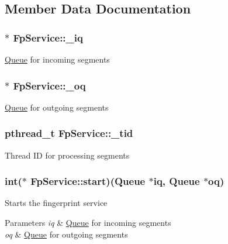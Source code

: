 \subsection{\-Member \-Data \-Documentation}
\hypertarget{structFpService_a0da51b062ecfa7d09074af07f6258581}{
\subsubsection[{\-\_\-iq}]{$\ast$ {\bf \-Fp\-Service\-::\-\_\-iq}}}\label{structFpService_a0da51b062ecfa7d09074af07f6258581}
\hyperlink{structQueue}{\-Queue} for incoming segments \hypertarget{structFpService_a78ba06235033bd5d83a7f425ef49fc49}{
\subsubsection[{\-\_\-oq}]{$\ast$ {\bf \-Fp\-Service\-::\-\_\-oq}}}\label{structFpService_a78ba06235033bd5d83a7f425ef49fc49}
\hyperlink{structQueue}{\-Queue} for outgoing segments \hypertarget{structFpService_a94191c2fd018c83395922a6a6d490f5d}{
\subsubsection[{\-\_\-tid}]{\setlength{\rightskip}{0pt plus 5cm}pthread\-\_\-t {\bf \-Fp\-Service\-::\-\_\-tid}}}\label{structFpService_a94191c2fd018c83395922a6a6d490f5d}
\-Thread \-I\-D for processing segments \hypertarget{structFpService_a8dc45a1cac37860a976a44674e4ddc70}{
\subsubsection[{start}]{\setlength{\rightskip}{0pt plus 5cm}int($\ast$ {\bf \-Fp\-Service\-::start})({\bf \-Queue} $\ast$iq, {\bf \-Queue} $\ast$oq)}}\label{structFpService_a8dc45a1cac37860a976a44674e4ddc70}
\-Starts the fingerprint service 
\begin{DoxyParams}{\-Parameters}
{\em iq} & \hyperlink{structQueue}{\-Queue} for incoming segments \\
\hline
{\em oq} & \hyperlink{structQueue}{\-Queue} for outgoing segments \\
\hline
\end{DoxyParams}
